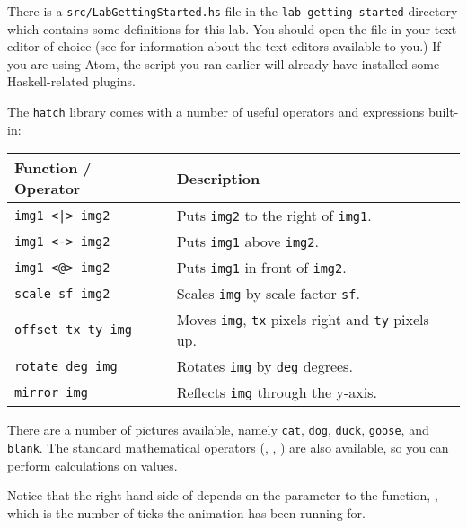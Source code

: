 There is a \texttt{\small src/LabGettingStarted.hs} file in the \texttt{\small lab-getting-started} directory which contains some definitions for this lab. You should open the file in your text editor of choice (see  for information about the text editors available to you.) If you are using Atom, the  script you ran earlier will already have installed some Haskell-related plugins.

\taskLine
{}
\taskLine

The \texttt{\small hatch} library comes with a number of useful operators and expressions built-in:

\begin{table}[H]
\centering
\begin{tabular}{ll}
Function / Operator       & Description                                          \\ \hline
\texttt{img1 <|> img2}    & Puts \texttt{img2} to the right of \texttt{img1}. \\
\texttt{img1 <-> img2}    & Puts \texttt{img1} above \texttt{img2}.           \\
\texttt{img1 <@> img2}    & Puts \texttt{img1} in front of \texttt{img2}.     \\
\texttt{scale sf img2}    & Scales \texttt{img} by scale factor \texttt{sf}.  \\
\texttt{offset tx ty img} & Moves \texttt{img}, \texttt{tx} pixels right and \texttt{ty} pixels up. \\
\texttt{rotate deg img}   & Rotates \texttt{img} by \texttt{deg} degrees.     \\
\texttt{mirror img}       & Reflects \texttt{img} through the y-axis.
\end{tabular}
\end{table}

There are a number of pictures available, namely \texttt{cat}, \texttt{dog}, \texttt{duck}, \texttt{goose}, and \texttt{blank}. The standard mathematical operators (\haskellIn{+}, \haskellIn{-}, \haskellIn{*}) are also available, so you can perform calculations on values.

Notice that the right hand side of  depends on the parameter to the  function, , which is the number of ticks the animation has been running for.

